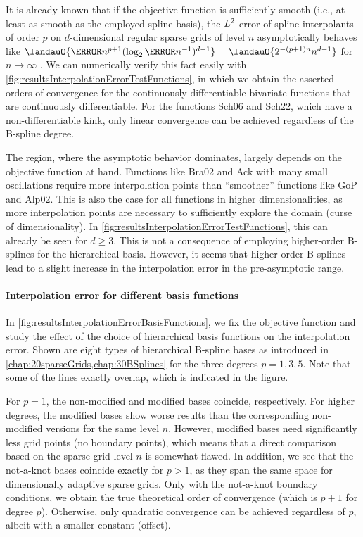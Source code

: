 It is already known that
if the objective function is sufficiently smooth
(i.e., at least as smooth as the employed spline basis),
the $L^2$ error of spline interpolants of order $p$ on
$d$-dimensional regular sparse grids of level $n$
asymptotically behaves like
$\landauO{\ms{n}^{p+1} (\log_2 \ms{n}^{-1})^{d-1}}
= \landauO{2^{-(p+1)n} n^{d-1}}$ for $n \to \infty$ \cite{Sickel11Spline}.
We can numerically verify this fact easily with
\cref{fig:resultsInterpolationErrorTestFunctions},
in which we obtain the asserted orders of convergence
for the continuously differentiable bivariate functions that
are continuously differentiable.
For the functions Sch06 and Sch22, which have a non-differentiable kink,
only linear convergence can be achieved regardless of the B-spline degree.

The region, where the asymptotic behavior dominates, largely depends
on the objective function at hand.
Functions like Bra02 and Ack with many small oscillations
require more interpolation points than ``smoother'' functions like
GoP and Alp02.
This is also the case for all functions in higher dimensionalities,
as more interpolation points are necessary to sufficiently explore the domain
(curse of dimensionality).
In \cref{fig:resultsInterpolationErrorTestFunctions}, this can already be seen
for $d \ge 3$.
This is not a consequence of employing higher-order B-splines for
the hierarchical basis.
However, it seems that higher-order B-splines lead to a slight increase
in the interpolation error in the pre-asymptotic range.

\paragraph{Interpolation error for different basis functions}

In \cref{fig:resultsInterpolationErrorBasisFunctions},
we fix the objective function and study the effect of the choice
of hierarchical basis functions on the interpolation error.
Shown are eight types of hierarchical B-spline bases as introduced in
\cref{chap:20sparseGrids,chap:30BSplines} for the three degrees
$p = 1, 3, 5$.
Note that some of the lines exactly overlap, which is indicated in
the figure.

For $p = 1$, the non-modified and modified bases coincide,
respectively.
For higher degrees, the modified bases show worse results than
the corresponding non-modified versions for the same level $n$.
However, modified bases need significantly less grid points
(no boundary points),
which means that a direct comparison based on the sparse grid level $n$
is somewhat flawed.
%
In addition, we see that the not-a-knot bases coincide exactly for $p > 1$,
as they span the same space for dimensionally adaptive sparse grids.
Only with the not-a-knot boundary conditions, we obtain the true
theoretical order of convergence (which is $p + 1$ for degree $p$).
Otherwise, only quadratic convergence can be achieved regardless of $p$,
albeit with a smaller constant (offset).

